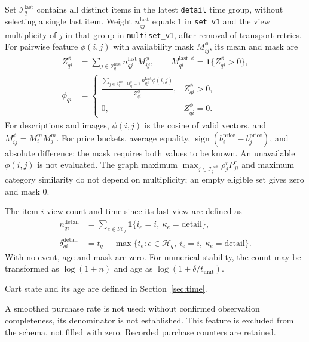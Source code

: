 \documentclass[12pt,a4paper]{article}
\newcommand{\code}[1]{{\ttfamily\small\nolinkurl{#1}}}
\newcommand{\ind}{\mathbf 1}
\theoremstyle{plainru}
\begin{document}
Set $\mathcal I_q^{\mathrm{last}}$ contains all distinct items
in the latest \code{detail} time group, without selecting a single last item.
Weight $n_{qj}^{\mathrm{last}}$ equals $1$ in \code{set_v1} and the view
multiplicity of $j$ in that group in \code{multiset_v1}, after removal
of transport retries. For pairwise feature $\phi(i,j)$ with availability
mask $M_{ij}^{\phi}$, its mean and mask are
\begin{align}\label{eq:model-last-group-mean}
Z_{qi}^{\phi}&=\sum_{j\in\mathcal I_q^{\mathrm{last}}}
 n_{qj}^{\mathrm{last}}M_{ij}^{\phi},\qquad
M_{qi}^{\mathrm{last},\phi}=\ind\{Z_{qi}^{\phi}>0\},\nonumber\\
\overline\phi_{qi}&=\begin{cases}
\displaystyle\frac{\sum_{j\in\mathcal I_q^{\mathrm{last}}:\,M_{ij}^{\phi}=1}
 n_{qj}^{\mathrm{last}}\phi(i,j)}{Z_{qi}^{\phi}},&Z_{qi}^{\phi}>0,\\
0,&Z_{qi}^{\phi}=0.
\end{cases}
\end{align}
For descriptions and images, $\phi(i,j)$ is the cosine of valid vectors,
and $M_{ij}^{\phi}=M_i^mM_j^m$. For price buckets, average equality,
$\operatorname{sign}(b_i^{\mathrm{price}}-b_j^{\mathrm{price}})$,
and absolute difference; the mask requires both values to be known.
An unavailable $\phi(i,j)$ is not evaluated.
The graph maximum $\max_{j\in\mathcal I_q^{\mathrm{last}}}\rho_j^rP^r_{ji}$
and maximum category similarity do not depend on multiplicity;
an empty eligible set gives zero and mask $0$.

The item $i$ view count and time since its last view are defined as
\begin{align}\label{eq:model-online-features}
n_{qi}^{\mathrm{detail}}&=
\sum_{e\in\mathcal H_q}\ind\{i_e=i,\ \kappa_e=\mathrm{detail}\},\\
\delta_{qi}^{\mathrm{detail}}&=
t_q-\max\{t_e:e\in\mathcal H_q,\ i_e=i,\ \kappa_e=\mathrm{detail}\}.
\nonumber
\end{align}
With no event, age and mask are zero.
For numerical stability, the count may be transformed as
$\log(1+n)$ and age as $\log(1+\delta/t_{\mathrm{unit}})$.

Cart state and its age are defined in Section~\ref{sec:time}.

A smoothed purchase rate is not used: without confirmed
observation completeness, its denominator is not established. This feature is excluded
from the schema, not filled with zero. Recorded purchase counters are retained.
\end{document}
